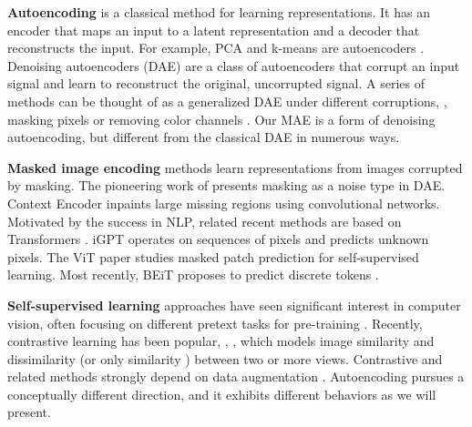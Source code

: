 \documentclass[10pt,twocolumn,letterpaper]{article}
\renewcommand{\paragraph}[1]{\vspace{1.25mm}\noindent\textbf{#1}}
\begin{document}
\paragraph{Autoencoding} is a classical method for learning representations. It has an encoder that maps an input to a latent representation and a decoder that reconstructs the input. For example, PCA and k-means are autoencoders \cite{Hinton1994}. Denoising autoencoders (DAE) \cite{Vincent2008} are a class of autoencoders that corrupt an input signal and learn to reconstruct the original, uncorrupted signal. A series of methods can be thought of as a generalized DAE under different corruptions, \eg, masking pixels \cite{Vincent2010, Pathak2016, Chen2020c} or removing color channels \cite{Zhang2016}. Our MAE is a form of denoising autoencoding, but different from the classical DAE in numerous ways.

\paragraph{Masked image encoding} methods learn representations from images corrupted by masking. The pioneering work of \cite{Vincent2010} presents masking as a noise type in DAE. Context Encoder \cite{Pathak2016} inpaints large missing regions using convolutional networks. Motivated by the success in NLP, related recent methods \cite{Chen2020c, Dosovitskiy2021, Bao2021} are based on Transformers \cite{Vaswani2017}. iGPT \cite{Chen2020c} operates on sequences of pixels and predicts unknown pixels. The ViT paper \cite{Dosovitskiy2021} studies masked patch prediction for self-supervised learning. Most recently, BEiT \cite{Bao2021} proposes to predict discrete tokens \cite{Oord2017, Ramesh2021}.

\paragraph{Self-supervised learning} approaches have seen significant interest in computer vision, often focusing on different pretext tasks for pre-training \cite{Doersch2015, Wang2015a, Noroozi2016, Zhang2016, Pathak2017, Gidaris2018}. Recently, contrastive learning \cite{Becker1992, Hadsell2006} has been popular, \eg, \cite{Wu2018a, Oord2018, He2020, Chen2020}, which models image similarity and dissimilarity (or only similarity \cite{Grill2020, Chen2021}) between two or more views. Contrastive and related methods strongly depend on data augmentation \cite{Chen2020, Grill2020, Chen2021}. Autoencoding pursues a conceptually different direction, and it exhibits different behaviors as we will present.
\end{document}
